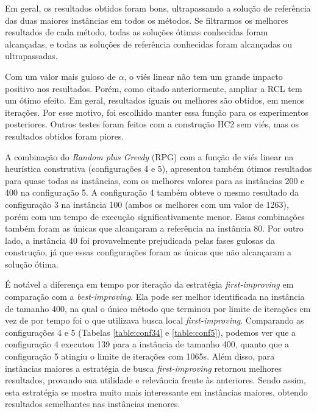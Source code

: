 \documentclass{MO824}
\begin{document}
Em geral, os resultados obtidos foram bons, ultrapassando a solução de referência das duas maiores instâncias em todos os métodos. Se filtrarmos os melhores resultados de cada método, todas as soluções ótimas conhecidas foram alcançadas, e todas as soluções de referência conhecidas foram alcançadas ou ultrapassadas.%

Com um valor mais guloso de $\alpha$, o viés linear não tem um grande impacto positivo nos resultados. Porém, como citado anteriormente, ampliar a RCL tem um ótimo efeito. Em geral, resultados iguais ou melhores são obtidos, em menos iterações. Por esse motivo, foi escolhido manter essa função para os experimentos posteriores. Outros testes foram feitos com a construção HC2 sem viés, mas os resultados obtidos foram piores.


A combinação do \textit{Random plus Greedy} (RPG) com a função de viés linear na heurística construtiva (configurações 4 e 5), apresentou também ótimos resultados para quase todas as instâncias, com os melhores valores para as instâncias 200 e 400 na configuração 5. A configuração 4 também obteve o mesmo resultado da configuração 3 na instância 100 (ambos os melhores com um valor de 1263), porém com um tempo de execução significativamente menor. Essas combinações também foram as únicas que alcançaram a referência na instância 80. Por outro lado, a instância 40 foi provavelmente prejudicada pelas fases gulosas da construção, já que essas configurações foram as únicas que não alcançaram a solução ótima.


É notável a diferença em tempo por iteração da estratégia \textit{first-improving} em comparação com a \textit{best-improving}. Ela pode ser melhor identificada na instância de tamanho 400, na qual o único método que terminou por limite de iterações em vez de por tempo foi o que utilizava busca local \textit{first-improving}. Comparando as configurações 4 e 5 (Tabelas \ref{table:conf34} e \ref{table:conf5}), podemos ver que a configuração 4 executou 139  para a instância de tamanho 400, quanto que a configuração 5 atingiu o limite de iterações com 1065s. Além disso, para instâncias maiores a estratégia de busca \textit{first-improving} retornou melhores resultados, provando sua utilidade e relevância frente às anteriores. Sendo assim, esta estratégia se mostra muito mais interessante em instâncias maiores, obtendo resultados semelhantes nas instâncias menores.
\end{document}
